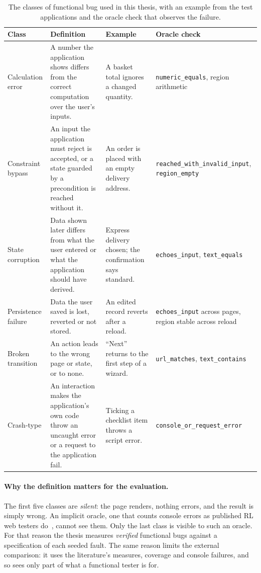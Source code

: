 \begin{table}[H]
\centering
\small
\caption{The classes of functional bug used in this thesis, with an example from the test
applications and the oracle check that observes the failure.}
\label{tab:bug-classes}
\footnotesize
\renewcommand{\code}[1]{\texttt{#1}}
\begin{tabularx}{\textwidth}{@{}p{2.1cm} X X p{5.0cm}@{}}
\toprule
Class & Definition & Example & Oracle check \\
\midrule
Calculation error & A number the application shows differs from the correct computation over the user's inputs. & A basket total ignores a changed quantity. & \code{numeric\_equals}, region arithmetic \\
Constraint bypass & An input the application must reject is accepted, or a state guarded by a precondition is reached without it. & An order is placed with an empty delivery address. & \code{reached\_with\_invalid\_input}, \code{region\_empty} \\
State corruption & Data shown later differs from what the user entered or what the application should have derived. & Express delivery chosen; the confirmation says standard. & \code{echoes\_input}, \code{text\_equals} \\
Persistence failure & Data the user saved is lost, reverted or not stored. & An edited record reverts after a reload. & \code{echoes\_input} across pages, region stable across reload \\
Broken transition & An action leads to the wrong page or state, or to none. & ``Next'' returns to the first step of a wizard. & \code{url\_matches}, \code{text\_contains} \\
Crash-type & An interaction makes the application's own code throw an uncaught error or a request to the application fail. & Ticking a checklist item throws a script error. & \code{console\_or\_request\_error} \\
\bottomrule
\end{tabularx}
\end{table}

\paragraph{Why the definition matters for the evaluation.} The first five classes are
\emph{silent}: the page renders, nothing errors, and the result is simply wrong. An implicit
oracle, one that counts console errors as published RL web testers
do~\cite{zheng2021webexplor, gu2025webrled}, cannot see them. Only the last class is visible
to such an oracle. For that reason the thesis measures \emph{verified} functional bugs
against a specification of each seeded fault. The same reason limits the external
comparison: it uses the literature's measures, coverage and console failures, and so sees
only part of what a functional tester is for.

